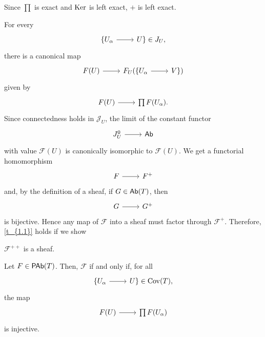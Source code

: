 \documentclass [11 pt, oneside] {article}
\begin{document}
Since $\prod$ is exact and $\operatorname{Ker}$ is left exact, $+$ is left exact.

\begin{remark}
	For every 
\[
\begin{tikzcd}[row sep = 0 pt]
	\{U_{\alpha}\ar[r]& U\} \in \mathscr{J}_U,
\end{tikzcd}
\]
there is a canonical map
\[
\begin{tikzcd}[row sep = 0 pt]
	\mathscr{F}(U)\ar[r]& \mathscr{F}_U(\{U_{\alpha}\ar[r]& V\})
\end{tikzcd}
\]
given by 
\[
\begin{tikzcd}[row sep = 0 pt]
	\mathscr{F}(U)\ar[r]& \prod \mathscr{F}(U_\alpha).
\end{tikzcd}
\]
Since connectedness holds in $\mathscr{J}_U$, the limit of the constant functor 
\[
\begin{tikzcd}[row sep = 0 pt]
	\mathscr{J}_U^0 \ar[r]& \catn{Ab}
\end{tikzcd}
\]
with value $\mathscr{F}(U)$ is canonically isomorphic to $\mathscr{F}(U)$.
We get a functorial homomorphism
\[
\begin{tikzcd}[row sep = 0 pt]
	\mathscr{F}\ar[r]&\mathscr{F}^+
\end{tikzcd}
\]
and, by the definition of a sheaf, if $\relax{G}\in \textsf{Ab}(\relax{T})$, then
\[
\begin{tikzcd}[row sep = 0 pt]
	\mathscr{G}\ar[r]&\mathscr{G}^+
\end{tikzcd}
\]
is bijective. 
Hence any map of $\mathscr{F}$ into a sheaf must factor through $\mathscr{F}^+$. Therefore, \cref{t_{1.1}} holds if we show
\end{remark}

\begin{surprise}\label{surprise}
$\mathscr{F}^{++}$ is a sheaf.
\end{surprise}

\begin{definition}
Let $\relax{F}\in \textsf{PAb}(\relax{T})$. Then, $\mathscr{F}$  if and only if, for all 
\[
\begin{tikzcd}[row sep = 0 pt]
	\{U_{\alpha}\ar[r]& U\} \in \Cov(\mathscr{T}),
\end{tikzcd}
\]
the map
\[
\begin{tikzcd}[row sep = 0 pt]
	\mathscr{F}(U)\ar[r]& \prod\mathscr{F}(U_\alpha)
\end{tikzcd}
\]
is injective.
\end{definition}
\end{document}
